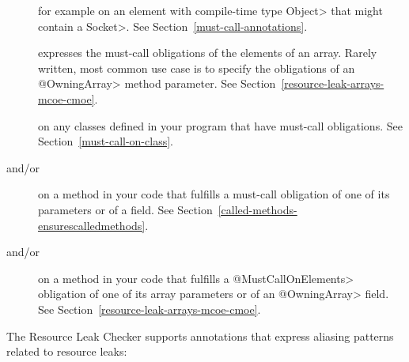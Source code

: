 \begin{description}

\item[]
for example on an element with compile-time type \<Object> that might contain a \<Socket>.
See Section~\ref{must-call-annotations}.

\item[]
expresses the must-call obligations of the elements of an array. Rarely written, most common use case is to specify the obligations of an \<@OwningArray> method parameter. See Section~\ref{resource-leak-arrays-mcoe-cmoe}.

\item[]
on any classes defined in your program that have must-call obligations. See Section~\ref{must-call-on-class}.

\item[ and/or
      ]
on a method in your code that fulfills a must-call obligation of one of its parameters or of a field.
See Section~\ref{called-methods-ensurescalledmethods}.

\item[ and/or
      ]
on a method in your code that fulfills a \<@MustCallOnElements> obligation of one of its array parameters or of an \<@OwningArray> field. See Section~\ref{resource-leak-arrays-mcoe-cmoe}.

\end{description}

The Resource Leak Checker supports annotations that express
aliasing patterns related to resource leaks:

